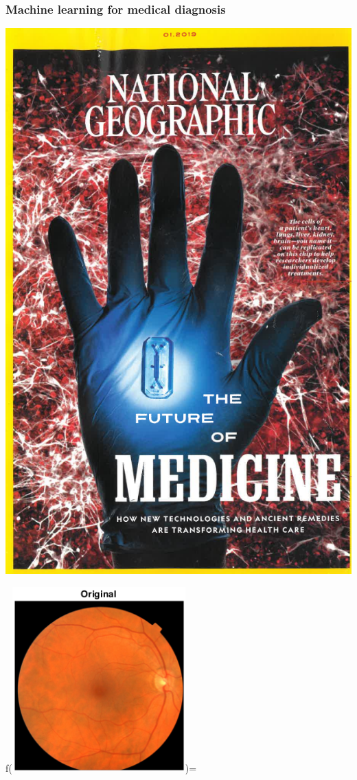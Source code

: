 \documentclass{beamer}
\begin{document}
\begin{frame}
  \frametitle{Machine learning for medical diagnosis}

\parbox{0.49\textwidth}{
\includegraphics[height=0.9\textheight]{retinal-scans/national-geographic-medicine-cover}
}
\parbox{0.49\textwidth}{
f(\includegraphics[width=0.5\textwidth]{retinal-scans/national-geographic-medicine-retina})=
}
\end{frame}
\end{document}
